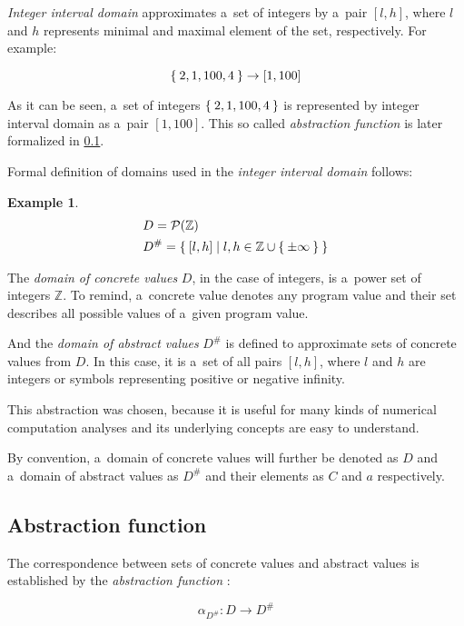 \documentclass[12pt,oneside]{fithesis2}
\theoremstyle{definition}
\newtheorem{exmp}{Example}[section]
\begin{document}
\textit{Integer interval domain} approximates a~set of integers by a~pair $[l, h]$, where $l$ and $h$ represents minimal and maximal element of the set, respectively. For example:

\[
  \Set{ 2, 1, 100, 4 } \to [1, 100]
\]

As it can be seen, a~set of integers $\Set{2, 1, 100, 4}$ is represented by integer interval domain as a~pair $[1, 100]$. This so called \textit{abstraction function} is later formalized in \ref{ssec:abstraction-function}.

Formal definition of domains used in the \textit{integer interval domain} follows:

\begin{exmp}
  \begin{align*}
    &D = \mathcal P(\mathbb Z)\\
    &D^\# = \Set{[l,h] | l,h \in \mathbb{Z} \cup \Set{\pm\infty}}\\
  \end{align*}
\end{exmp}

The \textit{domain of concrete values} $D$, in the case of integers, is a~power set of integers $\mathbb Z$. To remind, a~concrete value denotes any program value and their set describes all possible values of a~given program value.

And the \textit{domain of abstract values} $D^\#$ is defined to approximate sets of concrete values from $D$. In this case, it is a~set of all pairs $[l, h]$, where $l$ and $h$ are integers or symbols representing positive or negative infinity.

This abstraction was chosen, because it is useful for many kinds of numerical computation analyses\cite{mine-AIAA10} and its underlying concepts are easy to understand.

By convention, a~domain of concrete values will further be denoted as $D$ and a~domain of abstract values as $D^\#$ and their elements as $C$ and $a$ respectively.

\subsection{Abstraction function}\label{ssec:abstraction-function}

The correspondence between sets of concrete values and abstract values is established by the \textit{abstraction function} \cite{CousotCousot76-1}:

\[
\alpha_{D^\#}\colon D \to D^\#
\]
\end{document}
